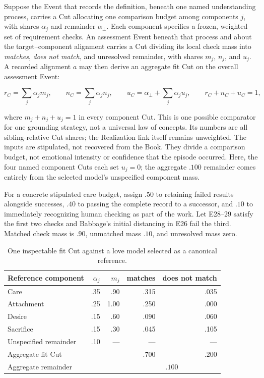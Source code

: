 \documentclass[11pt,a4paper]{article}
\begin{document}
Suppose the Event that records the definition, beneath one named understanding
process, carries a Cut allocating one comparison budget among components $j$,
with shares $\alpha_j$ and remainder $\alpha_{\bot}$. Each component specifies a frozen,
weighted set of requirement checks. An assessment Event beneath that process
and about the target--component alignment carries a Cut dividing its local
check mass into \emph{matches}, \emph{does not match}, and unresolved remainder,
with shares $m_j$, $n_j$, and $u_j$. A recorded alignment $a$ may then derive
an aggregate fit Cut on the overall assessment Event:

\begin{equation}
  r_C=\sum_j\alpha_jm_j,\qquad
  n_C=\sum_j\alpha_jn_j,\qquad
  u_C=\alpha_{\bot}+\sum_j\alpha_ju_j,
  \qquad r_C+n_C+u_C=1,
  \label{eq:concept-match-theory}
\end{equation}

where $m_j+n_j+u_j=1$ in every component Cut. This is one possible comparator
for one grounding strategy, not a universal law of concepts. Its numbers are
all sibling-relative Cut shares; the Realization link itself remains unweighted.
The inputs are stipulated, not recovered from the Book.
They divide a comparison budget, not emotional intensity or
confidence that the episode occurred.
Here, the four named component Cuts each set
$u_j=0$; the aggregate $.100$ remainder comes entirely from the selected
model's unspecified component mass.

For a concrete stipulated care budget, assign $.50$ to retaining failed results
alongside successes, $.40$ to passing the complete record to a successor, and
$.10$ to immediately recognizing human checking as part of the work.
Let E28--29 satisfy the first two checks and Babbage's initial distancing in
E26 fail the third. Matched check mass is $.90$, unmatched mass $.10$, and
unresolved mass zero.

\begin{table}[H]
\centering
\small
\begin{tabular}{lrrrr}
\toprule
Reference component & $\alpha_j$ & $m_j$ & matches & does not match \\
\midrule
Care & .35 & .90 & .315 & .035 \\
Attachment & .25 & 1.00 & .250 & .000 \\
Desire & .15 & .60 & .090 & .060 \\
Sacrifice & .15 & .30 & .045 & .105 \\
Unspecified remainder & .10 & --- & --- & --- \\
\midrule
Aggregate fit Cut & & & $.700$ & $.200$ \\
Aggregate remainder & & & \multicolumn{2}{c}{$.100$} \\
\bottomrule
\end{tabular}
\caption{One inspectable fit Cut against a love model selected as a canonical reference.}
\label{tab:theory-love}
\end{table}
\end{document}
